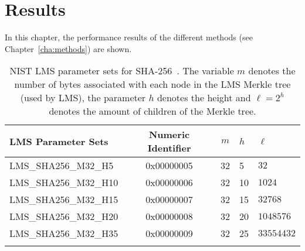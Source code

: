 \chapter{Results} %
\label{cha:results}

In this chapter, the performance results of the different methods (see Chapter~\ref{cha:methods}) are shown.

\begin{table}
\centering
\begin{tabular}{l c c l l} 
 \hline\noalign{\smallskip}
 \textbf{LMS Parameter Sets} & \textbf{Numeric Identifier} & \textbf{$m$} & \textbf{$h$} & $\ell$ \\
 \hline\noalign{\smallskip}
 LMS\_SHA256\_M32\_H5 & 0x00000005  & 32 & 5 & $32$ \\
 LMS\_SHA256\_M32\_H10 & 0x00000006  & 32 & 10 & $1024$ \\
 LMS\_SHA256\_M32\_H15 & 0x00000007  & 32 & 15 & $32768$ \\
 LMS\_SHA256\_M32\_H20 & 0x00000008  & 32 & 20 & $1048576$ \\
 LMS\_SHA256\_M32\_H35 & 0x00000009  & 32 & 25 & $33554432$ \\
 \hline\noalign{\smallskip}
 \end{tabular}
\caption{NIST LMS parameter sets for SHA-256~\cite{stateful_hashbased_sign_schemes_NIST_2020}. The variable $m$ denotes the number of bytes associated with each node in the LMS Merkle tree (used by LMS), the parameter $h$ denotes the height and $\ell = 2^h$ denotes the amount of children of the Merkle tree.} %
\label{table:nist_param_lms}
\end{table}

